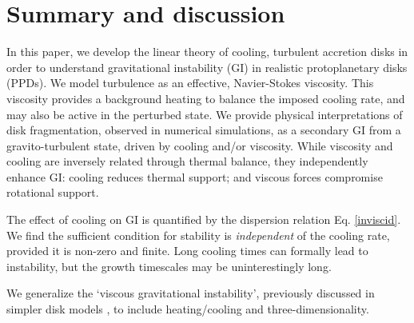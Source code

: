 \section{Summary and discussion}\label{summary}
In this paper, we develop the linear theory of cooling,
turbulent accretion disks in order to understand gravitational
instability (GI) in realistic protoplanetary disks (PPDs). 
We model turbulence as an effective, 
Navier-Stokes viscosity. This viscosity provides a 
background heating to balance the imposed cooling rate,  
and may also be active in the perturbed state. We provide physical
interpretations of disk fragmentation, observed in 
numerical simulations, as a secondary GI from a 
gravito-turbulent state, driven by cooling and/or viscosity. 
While viscosity and cooling are inversely related through thermal
balance, they independently enhance GI: cooling reduces thermal
support; and viscous forces compromise rotational support. 


The effect of cooling on GI is quantified by the dispersion
relation Eq. \ref{inviscid}. 
We find
the sufficient condition for stability is \emph{independent} of the
cooling rate, provided it is non-zero and finite.   
Long cooling times can
formally lead to instability, but the growth timescales may be
uninterestingly long. 




We generalize the `viscous gravitational instability', previously discussed in 
simpler disk models \citep{lynden-bell74,gammie96,hunter83}, to include
heating/cooling and three-dimensionality. 



